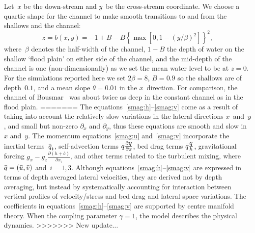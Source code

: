 \documentclass[twocolumn]{afmc_art}
\newcommand{\uu}{{\bar u}}
\newcommand{\vv}{{\bar v}}
\newcommand{\bq}{{\bar q}}
\newcommand{\qq}{{\bar{\vec q}}}
\renewcommand{\vec}[1]{\text{\boldmath$#1$}}
\begin{document}
Let~$x$ be the down-stream and $y$~be the cross-stream coordinate. 
We choose a quartic shape for the channel to make smooth transitions to and from the shallows and the channel: 
\begin{equation}
z=b(x,y)=-1+B-B\left\{\max\left[0,1-\left({y}/{\beta}\right)^2\right]\right\}^2,\label{bed:straight}
\end{equation}
where~$\beta$ denotes the half-width of the channel, $1-B$ the depth of water on the shallow `flood plain' on either side of the channel, and the mid-depth of the channel is one (non-dimensionally) as we set the mean water level to be at $z=0$.  
For the simulations reported here we set $2\beta=8$, $B=0.9$ so the shallows are of depth~$0.1$, and a mean slope $\theta=0.01$ in the $x$~direction.  
For comparison, the channel of Bousmar~\cite{Bousmar2002} was about twice as deep in the constant channel as in the flood plain.
=======
The equations~\eqref{smag:h}--\eqref{smag:v} come as a result of taking into account the relatively slow variations in the lateral directions $x$~and~$y$, and small but non-zero $\partial_x$ and $\partial_y$, thus these equations are smooth and slow in~$x$ and~$y$.  
The momentum equations~\eqref{smag:u} and~\eqref{smag:v} incorporate the inertial terms~$\qq_t$, self-advection terms $\qq\frac{\partial\qq}{\partial x}$, bed drag terms $\bq\frac{\qq}{h}$, gravitational forcing $g_x-g_z\frac{\partial(h+b)}{\partial x_i}$, and other terms related to the turbulent mixing, where $\qq=(\uu,\vv)$ and~$i=1,3$. 
Although equations~\eqref{smag:h}--\eqref{smag:v} are expressed in terms of depth averaged lateral velocities, they are derived not by depth averaging, but instead by systematically accounting for interaction between vertical profiles of velocity/stress and bed drag and lateral space variations. 
The coefficients in equations~\eqref{smag:h}--\eqref{smag:v} are supported by centre manifold theory. 
When the coupling parameter $\gamma=1$, the model describes the physical dynamics.
>>>>>>> New update...

\end{document}
